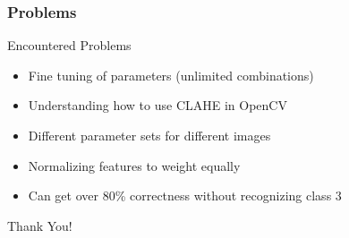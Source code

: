 \documentclass{beamer}
\begin{document}
\begin{frame}
	\frametitle{Problems}
	\begin{block}{Encountered Problems}
		\begin{itemize}
			\item Fine tuning of parameters (unlimited combinations)
			\item Understanding how to use CLAHE in OpenCV
			\item Different parameter sets for different images
			\item Normalizing features to weight equally
            \item Can get over 80\% correctness without recognizing class 3
		\end{itemize}
	\end{block}
\end{frame}

\begin{frame}
	\begin{center}
        \Huge Thank You!\\
    \end{center}
\end{frame}
\end{document}
